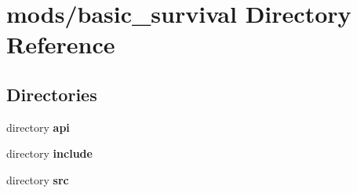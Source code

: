 \section{mods/basic\+\_\+survival Directory Reference}
\label{dir_8803d24ea1fd6fdb6644ce9a84c269d0}
\subsection*{Directories}
\begin{DoxyCompactItemize}
\item 
directory {\bf api}
\item 
directory {\bf include}
\item 
directory {\bf src}
\end{DoxyCompactItemize}
